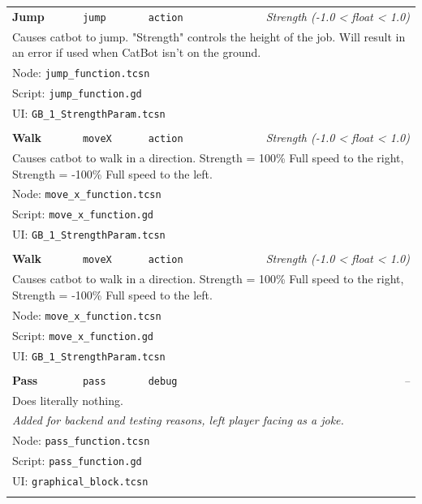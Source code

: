 \begin{center}
\begin{longtable}{lllr}
    \textbf{Jump}
    & \texttt{jump}
    & \texttt{action}
    & \textit{Strength (-1.0 < float < 1.0)}
    \\
    \multicolumn{4}{p{0.98\linewidth}}{
        Causes catbot to jump.
        "Strength" controls the height of the job.
        Will result in an error if used when CatBot isn't on the ground.
    }
    \\ \multicolumn{4}{l}{Node: \texttt{jump\_function.tcsn}}
    \\ \multicolumn{4}{l}{Script: \texttt{jump\_function.gd}}
    \\ \multicolumn{4}{l}{UI: \texttt{GB\_1\_StrengthParam.tcsn}}
    \\ \\

    \textbf{Walk}
    & \texttt{moveX}
    & \texttt{action}
    & \textit{Strength (-1.0 < float < 1.0)}
    \\
    \multicolumn{4}{p{0.98\linewidth}}{
        Causes catbot to walk in a direction.
        Strength =  100\% Full speed to the right,
        Strength = -100\% Full speed to the left.
    }
    \\ \multicolumn{4}{l}{Node: \texttt{move\_x\_function.tcsn}}
    \\ \multicolumn{4}{l}{Script: \texttt{move\_x\_function.gd}}
    \\ \multicolumn{4}{l}{UI: \texttt{GB\_1\_StrengthParam.tcsn}}
    \\ \\

    \textbf{Walk}
    & \texttt{moveX}
    & \texttt{action}
    & \textit{Strength (-1.0 < float < 1.0)}
    \\
    \multicolumn{4}{p{0.98\linewidth}}{
        Causes catbot to walk in a direction.
        Strength =  100\% Full speed to the right,
        Strength = -100\% Full speed to the left.
    }
    \\ \multicolumn{4}{l}{Node: \texttt{move\_x\_function.tcsn}}
    \\ \multicolumn{4}{l}{Script: \texttt{move\_x\_function.gd}}
    \\ \multicolumn{4}{l}{UI: \texttt{GB\_1\_StrengthParam.tcsn}}
    \\ \\

    \textbf{Pass}
    & \texttt{pass}
    & \texttt{debug}
    & \textit{--}
    \\
    \multicolumn{4}{p{0.98\linewidth}}{
        Does literally nothing.
    }
    \\
    \multicolumn{4}{p{0.98\linewidth}}{
        \textit{Added for backend and testing reasons, left player facing as a joke.}
    }
    \\ \multicolumn{4}{l}{Node: \texttt{pass\_function.tcsn}}
    \\ \multicolumn{4}{l}{Script: \texttt{pass\_function.gd}}
    \\ \multicolumn{4}{l}{UI: \texttt{graphical\_block.tcsn}}
    \\ \\


\end{longtable}
\end{center}
